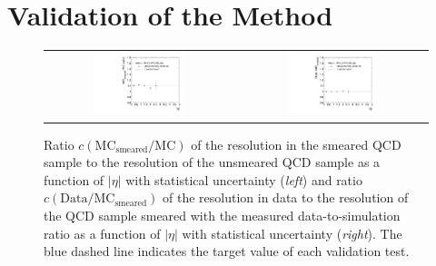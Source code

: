 \section{Validation of the Method}
\label{sec:jer_validation}
\begin{figure}[!tp]
  \centering
  \begin{tabular}{cc}
                \includegraphics[width=0.49\textwidth]{figures/ScalingFactorsVsEta_with_pli_PythiaSmearedVsPythia_v4b.pdf} &
                \includegraphics[width=0.49\textwidth]{figures/ScalingFactorsVsEta_with_pli_MCSmearedWithMeasuredValues_final_v4b.pdf}
  \end{tabular}
  \caption{Ratio $c\mathrm{(MC_{smeared}/MC)}$ of the resolution in the smeared QCD sample to the resolution of the unsmeared QCD sample as a function of $|\eta|$ with statistical uncertainty (\textit{left}) and ratio $c\mathrm{(Data/MC_{smeared})}$ of the resolution in data to the resolution of the QCD sample smeared with the measured data-to-simulation ratio as a function of $|\eta|$ with statistical uncertainty (\textit{right}). The blue dashed line indicates the target value of each validation test.}
  \label{fig:mc_closure}
\end{figure}
